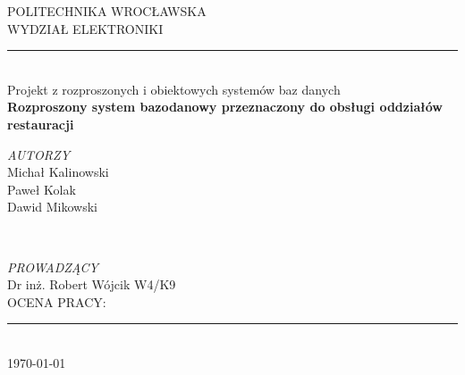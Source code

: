 \documentclass{article}
\begin{document}
 
\begin{titlepage} 
	\newcommand{\HRule}{\rule{\linewidth}{0.5mm}} 
	
	\center 
	
	\textsc{\LARGE POLITECHNIKA WROCŁAWSKA} \\[0.5cm]
	\textsc{\LARGE WYDZIAŁ ELEKTRONIKI} 
	
	\HRule\\[3.0cm]
	
	{\huge Projekt z rozproszonych i obiektowych systemów baz danych}\\[2.0cm] 
	
	{\huge\bfseries Rozproszony system bazodanowy przeznaczony do obsługi oddziałów restauracji}\\[2.0cm] 
	
	
	

	\begin{minipage}{0.4\textwidth}
		\begin{flushleft}
			\large
			\textit{AUTORZY}\\
			Michał Kalinowski\\
			Paweł Kolak\\
			Dawid Mikowski\\
		\end{flushleft}
	\end{minipage}
	~
	\begin{minipage}{0.4\textwidth}
		\begin{flushright}
			\large
			\textit{PROWADZĄCY}\\
			Dr inż. Robert Wójcik
			W4/K9
			\\[2.0cm] 
			OCENA PRACY:
		\end{flushright}
	\end{minipage}
	
	
	
	\vfill\vfill\vfill %
	\HRule\\[0.5cm]
	{\large\today} %
	
	
	 
	
	\vfill %
	
\end{titlepage}
\clearpage
\end{document}
